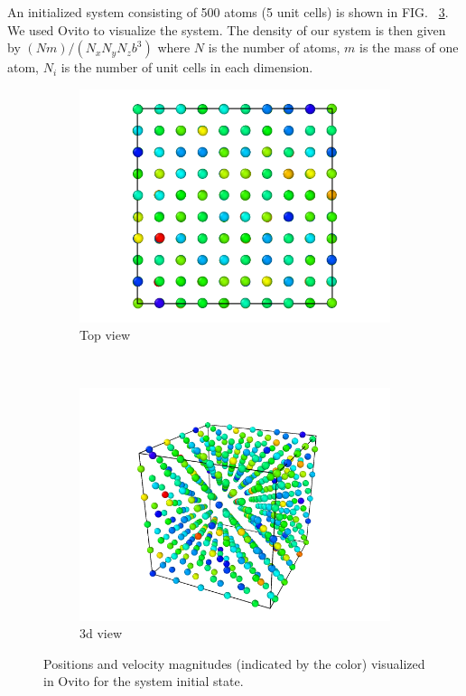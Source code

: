 \documentclass[10pt,showpacs,preprintnumbers,footinbib,amsmath,amssymb,aps,prl,twocolumn,groupedaddress,superscriptaddress,showkeys]{revtex4-1}
\begin{document}
An initialized system consisting of 500 atoms (5 unit cells) is shown in FIG.
~\ref{fig:init300K}. We used Ovito \citep{ovito} to visualize the system.
The density of our system is then given by $(Nm)/(N_x N_y N_z b^3)$
where $N$ is the number of atoms, $m$ is the mass of one atom, $N_i$
is the number of unit cells in each dimension.

\begin{figure}
\centering
	\begin{subfigure}[b]{0.5\textwidth}
	\centering
		\includegraphics[width=\textwidth]{figures/Init300Kxy.png}
		\caption{Top view}
		\label{fig:init300kxy}
	\end{subfigure}
\\
	\begin{subfigure}[b]{0.5\textwidth}
	\centering
		\includegraphics[width=\textwidth]{figures/Init300K3d.png}
		\caption{3d view}
		\label{fig:init300k3d}
	\end{subfigure}
	\caption{Positions and velocity magnitudes (indicated by the color)
	visualized in Ovito for the system initial state.}
	\label{fig:init300K}
\end{figure}
\end{document}
